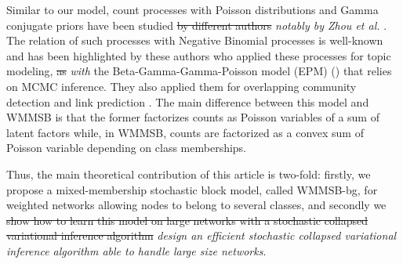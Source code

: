 Similar to our model, count processes with Poisson distributions and Gamma conjugate priors have been studied \sout{by different authors} \textit{notably by Zhou et al.} \cite{zhou2012augment, zhou2015negative}. The relation of such processes with Negative Binomial processes is well-known and has been highlighted by these authors who applied  these processes for topic modeling, \sout{as} \textit{with} the Beta-Gamma-Gamma-Poisson model (EPM) (\cite{zhou2012beta}) that relies on MCMC inference. They also applied them for  overlapping community detection and link prediction \cite{zhou2015infinite}. The main difference between this model and WMMSB is that the former factorizes counts as Poisson variables of a sum of latent factors while, in WMMSB, counts are factorized as a convex sum of Poisson variable depending on class memberships.

Thus, the main theoretical contribution of this article is two-fold: firstly, we propose a mixed-membership stochastic block model, called WMMSB-bg, for weighted networks allowing nodes to belong to several classes, and secondly we \sout{show how to learn this model on large networks with a stochastic collapsed variational inference algorithm} \textit{design an efficient stochastic collapsed variational inference algorithm able to handle large size networks}.

%
%
%
%
%
%
%


